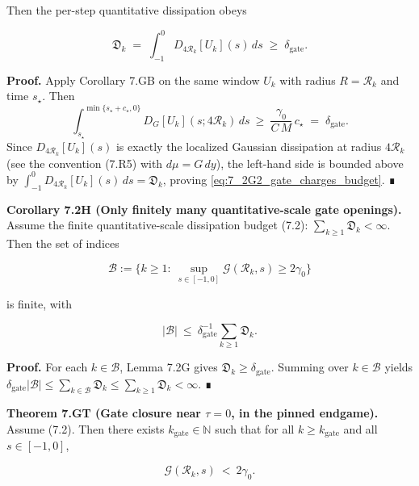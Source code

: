 \documentclass[
  11pt,
]{article}
\begin{document}
Then the per-step quantitative dissipation obeys

\begin{equation}
\mathfrak D_k
\;=\;\int_{-1}^{0}D_{4\mathcal R_k}[U_k](s)\,ds
\;\ge\;\delta_{\mathrm{gate}}.
\tag{7.2G2}\label{eq:7_2G2_gate_charges_budget}
\end{equation}

\textbf{Proof.} Apply Corollary 7.GB on the same window \(U_k\) with radius \(R=\mathcal R_k\) and time \(s_\star\). Then \[
\int_{s_\star}^{\min\{s_\star+c_\star,0\}} D_G[U_k](s;4\mathcal R_k)\,ds
\ \ge\ \frac{\gamma_0}{C\,M}\,c_\star
\;=\;\delta_{\mathrm{gate}}.
\] Since \(D_{4\mathcal R_k}[U_k](s)\) is exactly the localized Gaussian dissipation at radius \(4\mathcal R_k\) (see the convention (7.R5) with \(d\mu=G\,dy\)), the left-hand side is bounded above by \(\int_{-1}^{0}D_{4\mathcal R_k}[U_k](s)\,ds=\mathfrak D_k\), proving \eqref{eq:7_2G2_gate_charges_budget}. ∎

\textbf{Corollary 7.2H (Only finitely many quantitative-scale gate openings).} Assume the finite quantitative-scale dissipation budget (7.2): \(\sum_{k\ge1}\mathfrak D_k<\infty\). Then the set of indices

\begin{equation}
\mathcal B:=\Big\{k\ge1:\ \sup_{s\in[-1,0]}\mathcal G(\mathcal R_k,s)\ge 2\gamma_0\Big\}
\tag{7.2H1}\label{eq:7_2H1_bad_set}
\end{equation}

is finite, with

\begin{equation}
|\mathcal B|
\ \le\ \delta_{\mathrm{gate}}^{-1}\sum_{k\ge1}\mathfrak D_k.
\tag{7.2H2}\label{eq:7_2H2_bad_count}
\end{equation}

\textbf{Proof.} For each \(k\in\mathcal B\), Lemma 7.2G gives \(\mathfrak D_k\ge\delta_{\mathrm{gate}}\). Summing over \(k\in\mathcal B\) yields \(\delta_{\mathrm{gate}}|\mathcal B|\le\sum_{k\in\mathcal B}\mathfrak D_k\le\sum_{k\ge1}\mathfrak D_k<\infty\). ∎

\textbf{Theorem 7.GT (Gate closure near \(\tau=0\), in the pinned endgame).} Assume (7.2). Then there exists \(k_{\mathrm{gate}}\in\mathbb N\) such that for all \(k\ge k_{\mathrm{gate}}\) and all \(s\in[-1,0]\),

\begin{equation}
\mathcal G(\mathcal R_k,s)\ <\ 2\gamma_0.
\tag{7.GT}\label{eq:7GT_gate_closure}
\end{equation}
\end{document}
